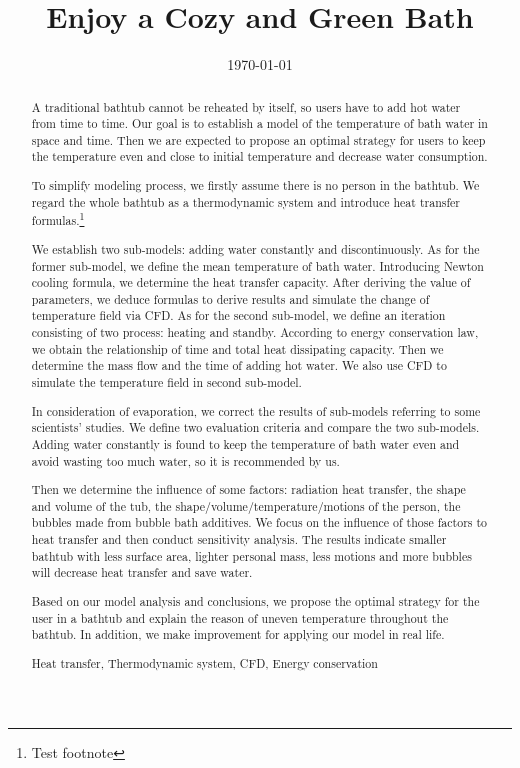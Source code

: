 \documentclass{mcmthesis}
\title{Enjoy a Cozy and Green Bath}
\date{\today}
\begin{document}
\begin{abstract}

A traditional bathtub cannot be reheated by itself, so users have to add hot water from time to time. Our goal is to establish a model of the temperature of bath water in space and time. Then we are expected to propose an optimal strategy for users to keep the temperature even and close to initial temperature and decrease water consumption.\cite{zhangrecommendation}

To simplify modeling process, we firstly assume there is no person in the bathtub. We regard the whole bathtub as a thermodynamic system and introduce heat transfer formulas.\footnote{Test footnote}

We establish two sub-models: adding water constantly and discontinuously. As for the former sub-model, we define the mean temperature of bath water. Introducing Newton cooling formula, we determine the heat transfer capacity. After deriving the value of parameters, we deduce formulas to derive results and simulate the change of temperature field via CFD. As for the second sub-model, we define an iteration consisting of two process: heating and standby. According to energy conservation law, we obtain the relationship of time and total heat dissipating capacity. Then we determine the mass flow and the time of adding hot water. We also use CFD to simulate the temperature field in second sub-model.

In consideration of evaporation, we correct the results of sub-models referring to some scientists' studies. We define two evaluation criteria and compare the two sub-models. Adding water constantly is found to keep the temperature of bath water even and avoid wasting too much water, so it is recommended by us.

Then we determine the influence of some factors: radiation heat transfer, the shape and volume of the tub, the shape/volume/temperature/motions of the person, the bubbles made from bubble bath additives. We focus on the influence of those factors to heat transfer and then conduct sensitivity analysis. The results indicate smaller bathtub with less surface area, lighter personal mass, less motions and more bubbles will decrease heat transfer and save water.

Based on our model analysis and conclusions, we propose the optimal strategy for the user in a bathtub and explain the reason of uneven temperature throughout the bathtub. In addition, we make improvement for applying our model in real life.

\begin{keywords}
Heat transfer, Thermodynamic system, CFD, Energy conservation
\end{keywords}

\end{abstract}
\end{document}
